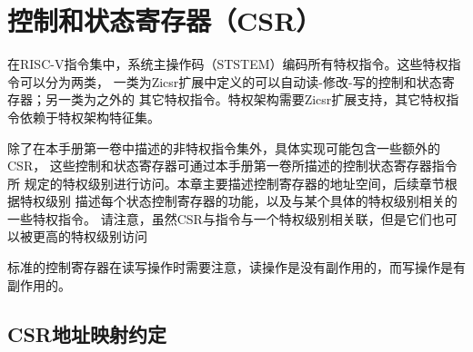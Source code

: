 \chapter{控制和状态寄存器（CSR）
    }
\label{chap:priv-csrs}


在RISC-V指令集中，系统主操作码（STSTEM）编码所有特权指令。这些特权指令可以分为两类，
一类为Zicsr扩展中定义的可以自动读-修改-写的控制和状态寄存器；另一类为之外的
其它特权指令。特权架构需要Zicsr扩展支持，其它特权指令依赖于特权架构特征集。


除了在本手册第一卷中描述的非特权指令集外，具体实现可能包含一些额外的CSR，
这些控制和状态寄存器可通过本手册第一卷所描述的控制状态寄存器指令所
规定的特权级别进行访问。本章主要描述控制寄存器的地址空间，后续章节根据特权级别
描述每个状态控制寄存器的功能，以及与某个具体的特权级别相关的一些特权指令。
请注意，虽然CSR与指令与一个特权级别相关联，但是它们也可以被更高的特权级别访问


标准的控制寄存器在读写操作时需要注意，读操作是没有副作用的，而写操作是有副作用的。

\section{CSR地址映射约定
    }

